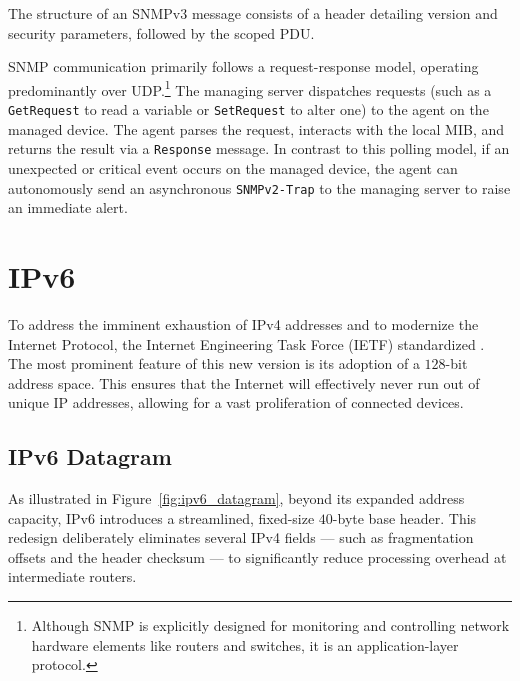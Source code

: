 The structure of an SNMPv3 message consists of a header detailing version and security parameters, followed by the scoped PDU. 

SNMP communication primarily follows a request-response model, operating predominantly over UDP.\footnote{Although SNMP is explicitly designed for monitoring and controlling network hardware elements like routers and switches, it is an application-layer protocol.}
The managing server dispatches requests (such as a \texttt{GetRequest} to read a variable or \texttt{SetRequest} to alter one) to the agent on the managed device.
The agent parses the request, interacts with the local MIB, and returns the result via a \texttt{Response} message.
In contrast to this polling model, if an unexpected or critical event occurs on the managed device, the agent can autonomously send an asynchronous \texttt{SNMPv2-Trap} to the managing server to raise an immediate alert.

\section{IPv6}
To address the imminent exhaustion of IPv4 addresses and to modernize the Internet Protocol, the Internet Engineering Task Force (IETF) standardized  \cite{rfc8200}. The most prominent feature of this new version is its adoption of a \(128\)-bit address space. This ensures that the Internet will effectively never run out of unique IP addresses, allowing for a vast proliferation of connected devices.

\subsection{IPv6 Datagram}
As illustrated in Figure~\ref{fig:ipv6_datagram}, beyond its expanded address capacity, IPv6 introduces a streamlined, fixed-size \(40\)-byte base header. 
This redesign deliberately eliminates several IPv4 fields --- such as fragmentation offsets and the header checksum --- to significantly reduce processing overhead at intermediate routers.

